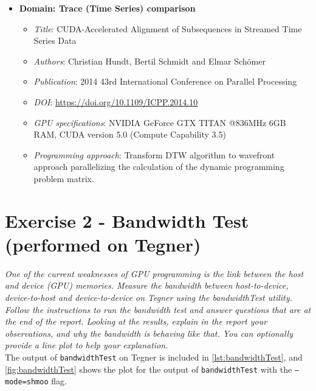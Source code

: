 \documentclass[12pt]{article}
\begin{document}
\begin{enumerate}
\begin{itemize}
        \item \textbf{Domain: Trace (Time Series) comparison}
        \begin{itemize}
            \item \textit{Title}: CUDA-Accelerated Alignment of Subsequences in Streamed Time Series Data
            \item \textit{Authors}: Christian Hundt, Bertil Schmidt and Elmar Schömer
            \item \textit{Publication}: 2014 43rd International Conference on Parallel Processing
            \item \textit{DOI}: \url{https://doi.org/10.1109/ICPP.2014.10}
            \item \textit{GPU specifications}: NVIDIA GeForce GTX TITAN @836MHz 6GB RAM, CUDA version 5.0 (Compute Capability 3.5)
            \item \textit{Programming approach}: Transform DTW algorithm to wavefront approach parallelizing the calculation of the dynamic programming problem matrix.
        \end{itemize}
    \end{itemize}
\end{enumerate}

\section{Exercise 2 - Bandwidth Test (performed on Tegner)}
\textit{One of the current weaknesses of GPU programming is the link between the host and device (GPU) memories. Measure the bandwidth between host-to-device, device-to-host and device-to-device on Tegner using the bandwidthTest utility. Follow the instructions to run the bandwidth test and answer questions that are at the end of the report. Looking at the results, explain in the report your observations, and why the bandwidth is behaving like that. You can optionally provide a line plot to help your explanation.}\\


The output of \texttt{bandwidthTest} on Tegner is included in \autoref{lst:bandwidthTest}, and \autoref{fig:bandwidthTest} shows the plot for the output of \texttt{bandwidthTest} with the \texttt{--mode=shmoo} flag.
\end{document}
